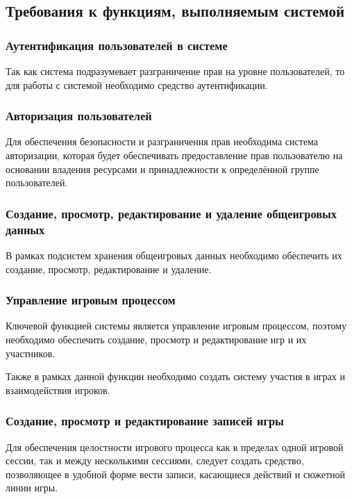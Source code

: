 \subsection{Требования к функциям, выполняемым системой}


\subsubsection{Аутентификация пользователей в системе}

Так как система подразумевает разграничение прав на уровне пользователей, то для работы с системой необходимо средство аутентификации.


\subsubsection{Авторизация пользователей}

Для обеспечения безопасности и разграничения прав необходима система авторизации, которая будет обеспечивать предоставление прав пользователю на основании владения ресурсами и принадлежности к определённой группе пользователей.


\subsubsection{Создание, просмотр, редактирование и удаление общеигровых данных}

В рамках подсистем хранения общеигровых данных необходимо обеспечить их создание, просмотр, редактирование и удаление.


\subsubsection{Управление игровым процессом}

Ключевой функцией системы является управление игровым процессом, поэтому необходимо обеспечить создание, просмотр и редактирование игр и их участников.

Также в рамках данной функции необходимо создать систему участия в играх и взаимодействия игроков.


\subsubsection{Создание, просмотр и редактирование записей игры}

Для обеспечения целостности игрового процесса как в пределах одной игровой сессии, так и между несколькими сессиями, следует создать средство, позволяющее в удобной форме вести записи, касающиеся действий и сюжетной линии игры.



